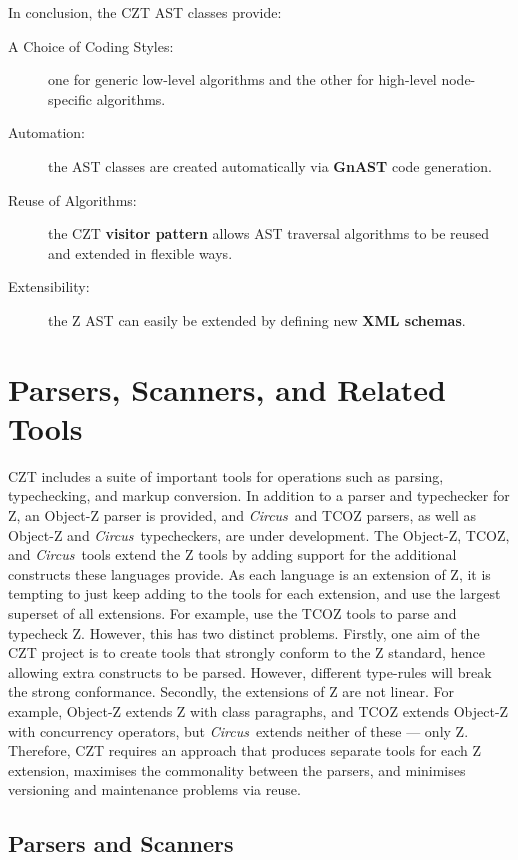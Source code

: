 \documentclass{llncs}
\newcommand{\Circus}{{\sf\slshape Circus}}
\begin{document}
  In conclusion, the CZT AST classes provide:
  \begin{description}
    \item[A Choice of Coding Styles:] one for generic low-level algorithms
      and the other for high-level node-specific algorithms.
    \item[Automation:] the AST classes are created automatically via 
      \textbf{GnAST} code generation.
    \item[Reuse of Algorithms:] the CZT \textbf{visitor pattern} allows
      AST traversal algorithms to be reused and extended in flexible ways.
    \item[Extensibility:] the Z AST can easily be extended by defining
      new \textbf{XML schemas}.
  \end{description}


\section{Parsers, Scanners, and Related Tools}
\label{parsers}

  CZT includes a suite of important tools for operations such as
  parsing, typechecking, and markup conversion. In addition to a
  parser and typechecker for Z, an Object-Z parser is provided, and
  \Circus\ and TCOZ parsers, as well as Object-Z and \Circus\
  typecheckers, are under development.  The Object-Z, TCOZ, and
  \Circus\ tools extend the Z tools by adding support for the
  additional constructs these languages provide.  As each language is an
  extension of Z, it is tempting to just keep adding to the tools
  for each extension, and use the largest superset of all
  extensions. For example, use the TCOZ tools to parse and typecheck
  Z. However, this has two distinct problems. Firstly, one aim of the
  CZT project is to create tools that strongly conform to the Z
  standard, hence allowing extra constructs to be parsed. However,
  different type-rules will break the strong conformance. Secondly, the
  extensions of Z are not linear. For example, Object-Z extends Z with
  class paragraphs, and TCOZ extends Object-Z with concurrency
  operators, but \Circus\ extends neither of these --- only
  Z. Therefore, CZT requires an approach that produces separate tools
  for each Z extension, maximises the commonality between the parsers,
  and minimises versioning and maintenance problems via reuse.

\subsection{Parsers and Scanners}
\end{document}
